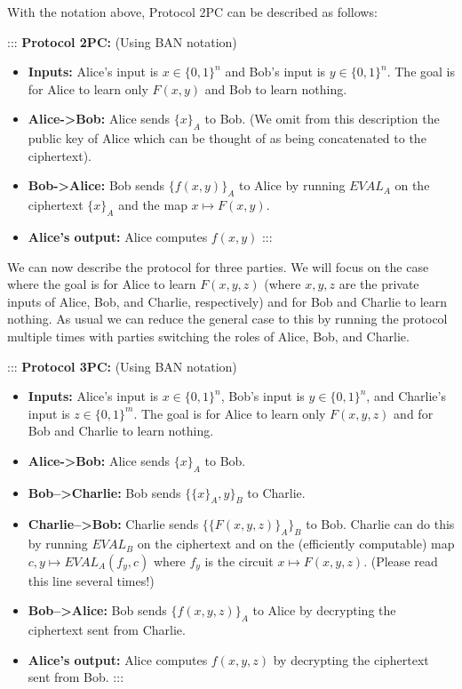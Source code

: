 With the notation above, Protocol 2PC can be described as follows:

::: \textbf{Protocol 2PC:} (Using BAN notation)

\begin{itemize}
\item
  \textbf{Inputs:} Alice's input is \(x\in\{0,1\}^n\) and Bob's input is
  \(y\in\{0,1\}^n\). The goal is for Alice to learn only \(F(x,y)\) and
  Bob to learn nothing.
\item
  \textbf{Alice-\textgreater Bob:} Alice sends \(\{ x \}_A\) to Bob. (We
  omit from this description the public key of Alice which can be
  thought of as being concatenated to the ciphertext).
\item
  \textbf{Bob-\textgreater Alice:} Bob sends \(\{ f(x,y) \}_A\) to Alice
  by running \(\ensuremath{\mathit{EVAL}}_A\) on the ciphertext
  \(\{ x\}_A\) and the map \(x \mapsto F(x,y)\).
\item
  \textbf{Alice's output:} Alice computes \(f(x,y)\) :::
\end{itemize}

We can now describe the protocol for three parties. We will focus on the
case where the goal is for Alice to learn \(F(x,y,z)\) (where \(x,y,z\)
are the private inputs of Alice, Bob, and Charlie, respectively) and for
Bob and Charlie to learn nothing. As usual we can reduce the general
case to this by running the protocol multiple times with parties
switching the roles of Alice, Bob, and Charlie.

::: \textbf{Protocol 3PC:} (Using BAN notation)

\begin{itemize}
\item
  \textbf{Inputs:} Alice's input is \(x\in\{0,1\}^n\), Bob's input is
  \(y\in\{0,1\}^n\), and Charlie's input is \(z\in \{0,1\}^m\). The goal
  is for Alice to learn only \(F(x,y,z)\) and for Bob and Charlie to
  learn nothing.
\item
  \textbf{Alice-\textgreater Bob:} Alice sends \(\{ x \}_A\) to Bob.
\item
  \textbf{Bob--\textgreater Charlie:} Bob sends \(\{ \{x\}_A , y \}_B\)
  to Charlie.
\item
  \textbf{Charlie--\textgreater Bob:} Charlie sends
  \(\{ \{ F(x,y,z) \}_A \}_B\) to Bob. Charlie can do this by running
  \(\ensuremath{\mathit{EVAL}}_B\) on the ciphertext and on the
  (efficiently computable) map
  \(c,y \mapsto \ensuremath{\mathit{EVAL}}_A(f_y,c)\) where \(f_y\) is
  the circuit \(x \mapsto F(x,y,z)\). (Please read this line several
  times!)
\item
  \textbf{Bob--\textgreater Alice:} Bob sends \(\{ f(x,y,z) \}_A\) to
  Alice by decrypting the ciphertext sent from Charlie.
\item
  \textbf{Alice's output:} Alice computes \(f(x,y,z)\) by decrypting the
  ciphertext sent from Bob. :::
\end{itemize}


